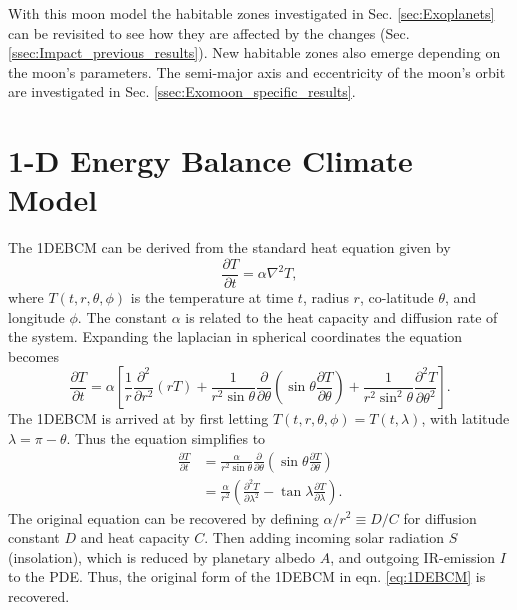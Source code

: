 \documentclass[12pt, onecolumn]{revtex4-2}    %
\newcommand{\partialderiv}[2]{\frac{\partial {#1}}{\partial {#2}}}
\newcommand{\partialderivsecnd}[2]{\frac{\partial^2 {#1}}{\partial {#2}^2}}
\begin{document}
With this moon model the habitable zones investigated in Sec. \ref{sec:Exoplanets} can be revisited to see how they are affected by the changes (Sec. \ref{ssec:Impact_previous_results}).
New habitable zones also emerge depending on the moon's parameters.
The semi-major axis and eccentricity of the moon's orbit are investigated in Sec. \ref{ssec:Exomoon_specific_results}.

\section{1-D Energy Balance Climate Model}\label{sec:1DEBCM}
%
The 1DEBCM can be derived from the standard heat equation given by
\begin{equation}
  \partialderiv{T}{t} = \alpha \nabla^2 T,
  \label{eq:heat_eqn}
\end{equation}
where $T(t, r, \theta, \phi)$ is the temperature at time $t$, radius $r$, co-latitude $\theta$, and longitude $\phi$.
The constant $\alpha$ is related to the heat capacity and diffusion rate of the system.
Expanding the laplacian in spherical coordinates the equation becomes
\begin{equation}
  \partialderiv{T}{t} = \alpha \left[\frac{1}{r} \partialderivsecnd{}{r} (r T)
    + \frac{1}{r^2 \sin\theta} \partialderiv{}{\theta}\left(\sin\theta \partialderiv{T}{\theta}\right)
    + \frac{1}{r^2 \sin^2\theta} \partialderivsecnd{T}{\theta} \right]. 
    \label{eq:FullyExpandedHeatEqn}
\end{equation}
The 1DEBCM is arrived at by first letting $T(t, r, \theta, \phi) = T(t, \lambda)$, with latitude $\lambda = \pi - \theta$. Thus the equation simplifies to
\begin{equation}
  \begin{split}
    \partialderiv{T}{t} & = \frac{\alpha}{r^2 \sin\theta} \partialderiv{}{\theta}\left(\sin\theta \partialderiv{T}{\theta}\right)   \\
                        & = \frac{\alpha}{r^2} \left(\partialderivsecnd{T}{\lambda} - \tan\lambda \partialderiv{T}{\lambda}\right).
  \end{split}
  \label{eq:1DEBCM_kernel}
\end{equation}
The original equation can be recovered by defining $\alpha / r^2 \equiv D / C$ for diffusion constant $D$ and heat capacity $C$.
Then adding incoming solar radiation $S$ (insolation), which is reduced by planetary albedo $A$, and outgoing IR-emission $I$ to the PDE.
Thus, the original form of the 1DEBCM in eqn. \eqref{eq:1DEBCM} is recovered.
\end{document}
